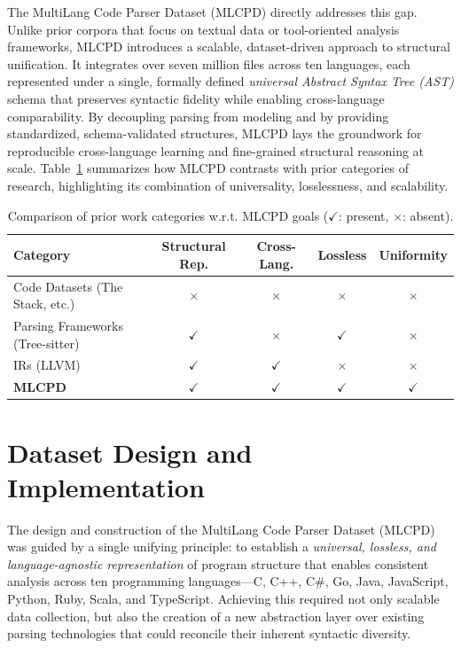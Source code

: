\documentclass{article}
\begin{document}
The MultiLang Code Parser Dataset (MLCPD) directly addresses this gap. Unlike prior corpora that focus on textual data or tool-oriented analysis frameworks, MLCPD introduces a scalable, dataset-driven approach to structural unification. It integrates over seven million files across ten languages, each represented under a single, formally defined \emph{universal Abstract Syntax Tree (AST)} schema that preserves syntactic fidelity while enabling cross-language comparability. By decoupling parsing from modeling and by providing standardized, schema-validated structures, MLCPD lays the groundwork for reproducible cross-language learning and fine-grained structural reasoning at scale. Table~\ref{tab:related-comparison} summarizes how MLCPD contrasts with prior categories of research, highlighting its combination of universality, losslessness, and scalability.

\begin{table}[H]
\centering
\caption{Comparison of prior work categories w.r.t. MLCPD goals ($\checkmark$: present, $\times$: absent).}
\label{tab:related-comparison}
\vspace{0.3em}
\setlength{\tabcolsep}{6pt}
\renewcommand{\arraystretch}{1.1}
\begin{tabular}{lcccc}
\toprule
\textbf{Category} & \textbf{Structural Rep.} & \textbf{Cross-Lang.} & \textbf{Lossless} & \textbf{Uniformity} \\
\midrule
Code Datasets (The Stack, etc.) & $\times$ & $\times$ & $\times$ & $\times$ \\
Parsing Frameworks (Tree-sitter) & $\checkmark$ & $\times$ & $\checkmark$ & $\times$ \\
IRs (LLVM) & $\checkmark$ & $\checkmark$ & $\times$ & $\times$ \\
\textbf{MLCPD} & $\checkmark$ & $\checkmark$ & $\checkmark$ & $\checkmark$ \\
\bottomrule
\end{tabular}
\end{table}

\section{Dataset Design and Implementation}
\label{sec:dataset_design_implementation}

The design and construction of the MultiLang Code Parser Dataset (MLCPD) was guided by a single unifying principle: to establish a \emph{universal, lossless, and language-agnostic representation} of program structure that enables consistent analysis across ten programming languages—C, C++, C\#, Go, Java, JavaScript, Python, Ruby, Scala, and TypeScript. Achieving this required not only scalable data collection, but also the creation of a new abstraction layer over existing parsing technologies that could reconcile their inherent syntactic diversity.
\end{document}

